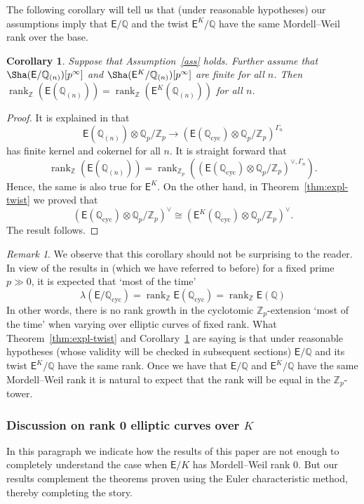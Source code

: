 \documentclass{amsart}
\newtheorem{corollary}[theorem]{Corollary}
\numberwithin{equation}{section}
\theoremstyle{remark}
\newtheorem{remark}[theorem]{Remark}
\newcommand{\cyc}{\operatorname{cyc}}
\newcommand{\rk}{\operatorname{rank}}
\newcommand{\Z}{\mathbb{Z}}
\newcommand{\Zp}{\mathbb{Z}_p}
\newcommand{\Qp}{\mathbb{Q}_p}
\newcommand{\Q}{\mathbb{Q}}
\newcommand{\EC}{\mathsf{E}}
\theoremstyle{plain} %
\begin{document}
The following corollary will tell us that (under reasonable hypotheses) our assumptions imply that $\EC/\Q$ and the twist $\EC^K/\Q$ have the same Mordell--Weil rank over the base.

\begin{corollary}
\label{cor to main expl-twist}
Suppose that Assumption~\ref{ass} holds.
Further assume that $\Sha(\EC/\Q_{(n)})[p^\infty]$ and $\Sha(\EC^K/\Q_{(n)})[p^\infty]$ are finite for all $n$.
Then $\rk_{\Z}(\EC(\Q_{(n)}))=\rk_{\Z}(\EC^K(\Q_{(n)}))$ for all $n$.
\end{corollary}

\begin{proof}
It is explained in \cite[Remark~2.1.6(2)]{Lee20} that
\[
\EC(\Q_{(n)}) \otimes \Qp/\Zp \longrightarrow (\EC(\Q_{\cyc})\otimes \Qp/\Z_p)^{\Gamma_n}
\]
has finite kernel and cokernel for all $n$.
It is straight forward that
\[
\rk_{\Z}(\EC(\Q_{(n)})) = \rk_{\Zp}((\EC(\Q_{\cyc})\otimes \Qp/\Z_p)^{\vee,\Gamma_n}).
\]
Hence, the same is also true for $\EC^{K}$.
On the other hand, in Theorem~\ref{thm:expl-twist} we proved that 
\[
(\EC(\Q_{\cyc})\otimes \Qp/\Z_p)^\vee \cong (\EC^K(\Q_{\cyc})\otimes \Qp/\Z_p)^\vee.
\]
The result follows.
\end{proof}



\begin{remark}
We observe that this corollary should not be surprising to the reader.
In view of the results in \cite{KR21} (which we have referred to before) for a fixed prime $p\gg 0$, it is expected that `most of the time'
\[
\lambda(\EC/\Q_{\cyc}) = \rk_{\Z} \EC(\Q_{\cyc}) = \rk_{\Z} \EC(\Q)
\]
In other words, there is no rank growth in the cyclotomic $\Zp$-extension `most of the time' when varying over elliptic curves of fixed rank.
{What Theorem~\ref{thm:expl-twist} and Corollary~\ref{cor to main expl-twist} are saying is that under reasonable hypotheses (whose validity will be checked in subsequent sections) $\EC/\Q$ and its twist $\EC^{K}/\Q$ have the same rank.}
Once {we have that $\EC/\Q$ and $\EC^K/\Q$ have the same Mordell--Weil rank} it is natural to expect that the rank will be equal in the $\Zp$-tower.
\end{remark}

\subsubsection*{Discussion on rank 0 elliptic curves over $K$}
In this paragraph we indicate how the results of this paper are not enough to completely understand the case when $\EC/K$ has Mordell--Weil rank 0.
But our results complement the theorems proven using the Euler characteristic method, thereby completing the story.
\end{document}
